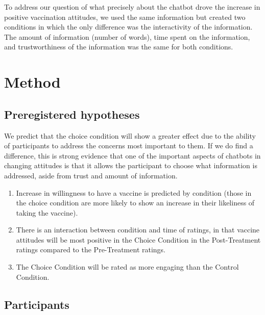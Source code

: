 \documentclass[
  english,
  ,jou,floatsintext]{apa6}
\begin{document}
To address our question of what precisely about the chatbot drove the increase in positive vaccination attitudes, we used the same information but created two conditions in which the only difference was the interactivity of the information. The amount of information (number of words), time spent on the information, and trustworthiness of the information was the same for both conditions.

\hypertarget{method}{%
\section{Method}\label{method}}

\hypertarget{preregistered-hypotheses}{%
\subsection{Preregistered hypotheses}\label{preregistered-hypotheses}}

We predict that the choice condition will show a greater effect due to the ability of participants to address the concerns most important to them. If we do find a difference, this is strong evidence that one of the important aspects of chatbots in changing attitudes is that it allows the participant to choose what information is addressed, aside from trust and amount of information.

\begin{enumerate}
\def\labelenumi{\arabic{enumi})}
\item
  Increase in willingness to have a vaccine is predicted by condition (those in the choice condition are more likely to show an increase in their likeliness of taking the vaccine).
\item
  There is an interaction between condition and time of ratings, in that vaccine attitudes will be most positive in the Choice Condition in the Post-Treatment ratings compared to the Pre-Treatment ratings.
\item
  The Choice Condition will be rated as more engaging than the Control Condition.
\end{enumerate}

\hypertarget{participants}{%
\subsection{Participants}\label{participants}}
\end{document}
